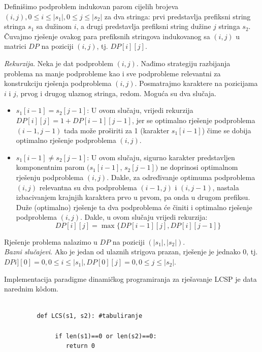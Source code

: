 \begin{solution}
	    Definišimo podproblem indukovan parom cijelih brojeva $(i,j), 0 \leq i \leq |s_1|, 0 \leq j \leq |s_2|$  za dva stringa: prvi predstavlja  prefiksni string stringa $s_1$ sa dužinom $i$,  a drugi predstavlja prefiksni string dužine $j$ stringa $s_2$.  Čuvajmo rješenje ovakog para prefiksnih stringova indukovanog sa $(i,j)$ u matrici $DP$ na poziciji $(i, j)$, tj. $DP[i][j]$.
	    
	    \textit{Rekurzija}. Neka je dat podproblem $(i, j)$. Nađimo strategiju razbijanja problema na manje podprobleme kao i sve podprobleme relevantni za konstru\-kciju rješenja podproblema $(i, j)$. Posmatrajmo karaktere na pozicijama $i$ i $j$, prvog i drugog ulaznog stringa, redom.  Moguća su dva slučaja.
	    \begin{itemize}
	    	\item $s_1[i-1] = s_2[j-1]$: U ovom slučaju, vrijedi rekurzija $DP[i][j] = 1 + DP[i-1][j-1]$, jer  se optimalno rješenje podproblema $(i-1, j-1)$ tada može proširiti za 1 (karakter $s_1[i-1]$) čime se dobija optimalno rješenje podproblema $(i,j)$.
	    	\item  $s_1[i-1] \neq s_2[j-1]$: U ovom slučaju, sigurno karakter predstavljen komponentnim parom  $(s_1[i-1]$, $s_2[j-1])$ ne doprinosi optimalnom rješenju podproblema $(i,j)$. Dakle,  za određivanje optimuma podpro\-blema $(i,j)$ relevantna su dva podproblema $(i-1, j)$ i $(i, j-1)$, nastala izbacivanjem krajnjih karaktera prvo u prvom, pa onda u drugom prefiksu. Duže (optimalno) rješenje ta dva podproblema će činiti i optimalno rješenje podproblema $(i,j)$. Dakle, u ovom slučaju vrijedi rekurzija:
	    	$$DP[i][j] = \max \{ DP[i-1][j], DP[i][j-1] \} $$ 
	    	
	    \end{itemize}
	    Rješenje problema nalazimo u $DP$ na poziciji $(|s_1|, |s_2|)$. \\
	    
	    \textit{Bazni slučajevi}. Ako je jedan od ulaznih strigova prazan, rješenje je jednako 0, tj.  $DPi][0]= 0, 0 \leq i \leq |s_1|,  DP[0][j] = 0, 0 \leq j \leq |s_2|$. 
	    
	 Implementacija paradigme dinamičkog programiranja za rješavanje LCSP je data narednim k\^odom. 
 \begin{verbatim}
	    	
	     def LCS(s1, s2): #tabuliranje
	    	      
	    	  if len(s1)==0 or len(s2)==0:
	    	     return 0
	    	     

\end{verbatim}
\end{solution}
